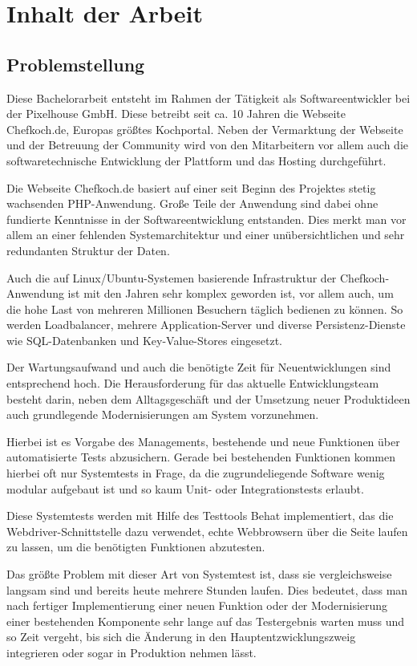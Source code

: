\section{Inhalt der Arbeit}

\subsection{Problemstellung}

Diese Bachelorarbeit entsteht im Rahmen der Tätigkeit als Softwareentwickler bei der Pixelhouse GmbH. Diese betreibt seit ca. 10 Jahren die Webseite Chefkoch.de, Europas größtes Kochportal. Neben der Vermarktung der Webseite und der Betreuung der Community wird von den Mitarbeitern vor allem auch die softwaretechnische Entwicklung der Plattform und das Hosting durchgeführt.

Die Webseite Chefkoch.de basiert auf einer seit Beginn des Projektes stetig wachsenden PHP-Anwendung. Große Teile der Anwendung sind dabei ohne fundierte Kenntnisse in der Softwareentwicklung entstanden. Dies merkt man vor allem an einer fehlenden Systemarchitektur und einer unübersichtlichen und sehr redundanten Struktur der Daten.

Auch die auf Linux/Ubuntu-Systemen basierende Infrastruktur der Chefkoch-Anwendung ist mit den Jahren sehr komplex geworden ist, vor allem auch, um die hohe Last von mehreren Millionen Besuchern täglich bedienen zu können. So werden Loadbalancer, mehrere Application-Server und diverse Persistenz-Dienste wie SQL-Datenbanken und Key-Value-Stores eingesetzt.

Der Wartungsaufwand und auch die benötigte Zeit für Neuentwicklungen sind entsprechend hoch. Die Herausforderung für das aktuelle Entwicklungsteam besteht darin, neben dem Alltagsgeschäft und der Umsetzung neuer Produktideen auch grundlegende Modernisierungen am System vorzunehmen.

Hierbei ist es Vorgabe des Managements, bestehende und neue Funktionen über automatisierte Tests abzusichern. Gerade bei bestehenden Funktionen kommen hierbei oft nur Systemtests in Frage, da die zugrundeliegende Software wenig modular aufgebaut ist und so kaum Unit- oder Integrationstests erlaubt.

Diese Systemtests werden mit Hilfe des Testtools Behat implementiert, das die Webdriver-Schnittstelle dazu verwendet, echte Webbrowsern über die Seite laufen zu lassen, um die benötigten Funktionen abzutesten.

Das größte Problem mit dieser Art von Systemtest ist, dass sie vergleichsweise langsam sind und bereits heute mehrere Stunden laufen. Dies bedeutet, dass man nach fertiger Implementierung einer neuen Funktion oder der Modernisierung einer bestehenden Komponente sehr lange auf das Testergebnis warten muss und so Zeit vergeht, bis sich die Änderung in den Hauptentzwicklungszweig integrieren oder sogar in Produktion nehmen lässt.

